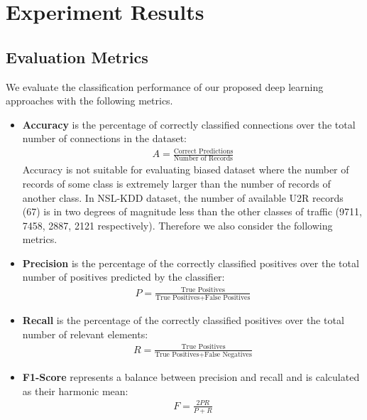 \section{Experiment Results}

\subsection{Evaluation Metrics}
We evaluate the classification performance of our proposed deep learning approaches
with the following metrics.
\begin{itemize}
    \item \textbf{Accuracy} is the percentage of correctly classified connections
        over the total number of connections in the dataset:
        \begin{align}
            A = \frac{\text{Correct Predictions}}{\text{Number of Records}}
        \end{align} 
        Accuracy is not suitable for evaluating biased dataset where the number
        of records of some class is extremely larger than the number of
        records of another class.
        In NSL-KDD dataset, the number of available U2R records (67)
        is in two degrees of magnitude less than the other classes of traffic (9711, 7458, 2887, 2121 respectively).
        Therefore we also consider the following metrics.
    \item \textbf{Precision} is the percentage of the correctly classified positives over
        the total number of positives predicted by the classifier:
                \begin{align}
                    P = \frac{\text{True Positives}}{\text{True Positives} + \text{False Positives}}
                \end{align}
    \item \textbf{Recall} is the percentage of the correctly classified positives over
        the total number of relevant elements:
                \begin{align}
                    R = \frac{\text{True Positives}}{\text{True Positives} + \text{False Negatives}}
                \end{align}
    \item \textbf{F1-Score} represents a balance between precision and recall and is calculated
        as their harmonic mean:
                \begin{align}
                    F = \frac{2PR}{P + R}
                \end{align}
\end{itemize}
